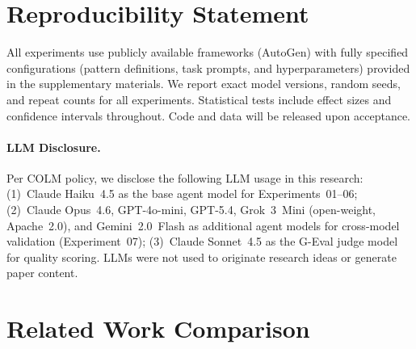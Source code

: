 \documentclass{article}
\begin{document}
\section*{Reproducibility Statement}

All experiments use publicly available frameworks (AutoGen) with fully specified configurations (pattern definitions, task prompts, and hyperparameters) provided in the supplementary materials. We report exact model versions, random seeds, and repeat counts for all experiments. Statistical tests include effect sizes and confidence intervals throughout. Code and data will be released upon acceptance.

\paragraph{LLM Disclosure.} Per COLM policy, we disclose the following LLM usage in this research: (1)~Claude Haiku~4.5 as the base agent model for Experiments~01--06; (2)~Claude Opus~4.6, GPT-4o-mini, GPT-5.4, Grok~3~Mini (open-weight, Apache~2.0), and Gemini~2.0~Flash as additional agent models for cross-model validation (Experiment~07); (3)~Claude Sonnet~4.5 as the G-Eval judge model for quality scoring. LLMs were not used to originate research ideas or generate paper content.





\appendix

\section{Related Work Comparison}
\label{app:related_table}
\end{document}
